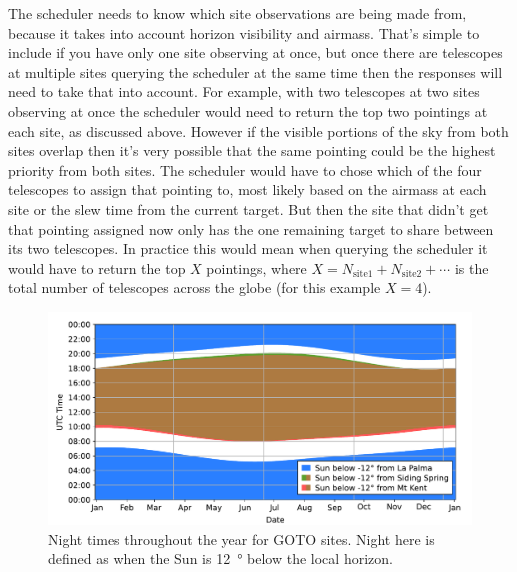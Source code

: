 \begin{colsection}
\begin{colsection}
The scheduler needs to know which site observations are being made from, because it takes into account horizon visibility and airmass. That's simple to include if you have only one site observing at once, but once there are telescopes at multiple sites querying the scheduler at the same time then the responses will need to take that into account. For example, with two telescopes at two sites observing at once the scheduler would need to return the top two pointings at each site, as discussed above. However if the visible portions of the sky from both sites overlap then it's very possible that the same pointing could be the highest priority from both sites. The scheduler would have to chose which of the four telescopes to assign that pointing to, most likely based on the airmass at each site or the slew time from the current target. But then the site that didn't get that pointing assigned now only has the one remaining target to share between its two telescopes. In practice this would mean when querying the scheduler it would have to return the top $X$ pointings, where $X = N_\text{site1} + N_\text{site2} + \cdots$ is the total number of telescopes across the globe (for this example $X=4$).

\begin{figure}[t]
    \begin{center}
        \includegraphics[width=\linewidth]{images/nights.pdf}
    \end{center}
    \caption[Night times throughout the year for GOTO sites]{
        Night times throughout the year for GOTO sites. Night here is defined as when the Sun is \SI{12}{\degree} below the local horizon.
    }\label{fig:nights}
\end{figure}


\end{colsection}
\end{colsection}
